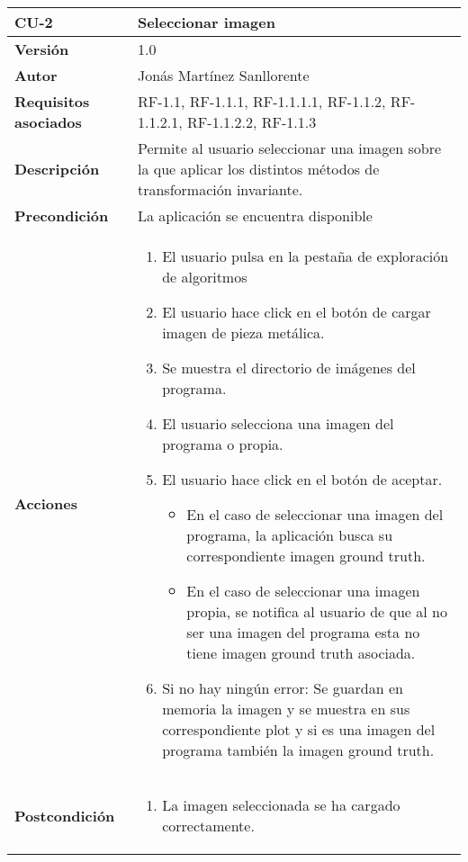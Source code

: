 \begin{table}[p]
	\centering
	\begin{tabularx}{\linewidth}{ p{} p{} }
		\toprule
		\textbf{CU-2}    & \textbf{Seleccionar imagen}\\
		\toprule
		\textbf{Versión}              & 1.0    \\
		\textbf{Autor}                & Jonás Martínez Sanllorente \\
		\textbf{Requisitos asociados} & RF-1.1, RF-1.1.1, RF-1.1.1.1, RF-1.1.2, RF-1.1.2.1, RF-1.1.2.2, RF-1.1.3 \\
		\textbf{Descripción}          & Permite al usuario seleccionar una imagen sobre la que aplicar los distintos métodos de transformación invariante.\\
		\textbf{Precondición}         & La aplicación se encuentra disponible \\
		\textbf{Acciones}             &
		\begin{enumerate}
			\def\labelenumi{\arabic{enumi}.}
			\tightlist
			\item El usuario pulsa en la pestaña de exploración de algoritmos
            \item El usuario hace click en el botón de cargar imagen de pieza metálica.
            \item Se muestra el directorio de imágenes del programa.
            \item El usuario selecciona una imagen del programa o propia.
            \item El usuario hace click en el botón de aceptar.
            \begin{itemize}
                \item En el caso de seleccionar una imagen del programa, la aplicación busca su correspondiente imagen ground truth.
                \item En el caso de seleccionar una imagen propia, se notifica al usuario de que al no ser una imagen del programa esta no tiene imagen ground truth asociada.
            \end{itemize}
            \item Si no hay ningún error: Se guardan en memoria la imagen y se muestra en sus correspondiente plot y si es una imagen del programa también la imagen ground truth.
		\end{enumerate}\\
		\textbf{Postcondición}        & 
           \begin{enumerate}
                \item La imagen seleccionada se ha cargado correctamente.

\end{enumerate}
\end{tabularx}
\end{table}
